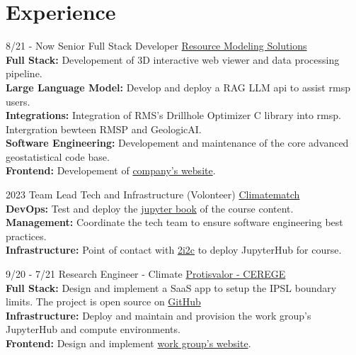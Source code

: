 \documentclass[]{friggeri-cv}
\begin{document}
\section{Experience}
\begin{entrylist}
	
	\entry
	{8/21 - Now}
	{Senior Full Stack Developer}
	{\href{https://resourcemodelingsolutions.com/}{Resource Modeling Solutions}}
	{
	\\[-0.5em]
	\textbf{Full Stack: }Developement of 3D interactive web viewer and data processing pipeline.
	\\[3pt]
	\textbf{Large Language Model: }Develop and deploy a RAG LLM api to assist rmsp users. 
	\\[3pt]
	\textbf{Integrations: }Integration of RMS's Drillhole Optimizer C library into rmsp. Intergration bewteen RMSP and GeologicAI.
	\\[3pt]
	\textbf{Software Engineering: }Developement and maintenance of the core advanced geostatistical code base.
	\\[3pt]
	\textbf{Frontend: }Developement of \href{https://resourcemodelingsolutions.com}{company's website}.
	}

	\entry
	{2023}
	{Team Lead Tech and Infrastructure (Volonteer)}
	{\href{https://sites.google.com/climatematch.io/academy/about}{Climatematch}}
	{
		\\[-0.5em]
		\textbf{DevOps: }Test and deploy the \href{https://comptools.climatematch.io/tutorials/intro.html}{jupyter book} of the course content. 
		\\[3pt]
		\textbf{Management: }Coordinate the tech team to ensure software engineering best practices.
		\\[3pt]
		\textbf{Infrastructure: }Point of contact with \href{https://2i2c.org}{2i2c} to deploy JupyterHub for course.
	}
  
	\entry
	{9/20 - 7/21}
	{Research Engineer - Climate}
	{\href{https://paleoclim-cnrs.github.io/}{Protisvalor - CEREGE}}
	{
	\\[-0.5em]
	\textbf{Full Stack: } Design and implement a SaaS app to setup the IPSL boundary limits. The project is open source on \href{https://cerege-cl.github.io/netcdf_editor_app/}{GitHub}
	\\[3pt]
	\textbf{Infrastructure: } Deploy and maintain and provision the work group's JupyterHub and compute environments.
	\\[3pt]
	\textbf{Frontend: } Design and implement \href{https://paleoclim-cnrs.github.io}{work group's website}.
	}
	

\end{entrylist}
\end{document}
